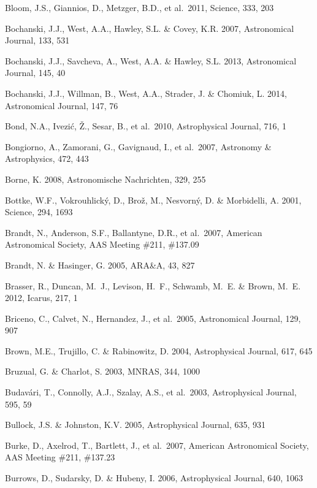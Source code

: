 \documentclass{emulateapj}
\begin{document}
\begin{thebibliography}{}
\bibitem[()]{} Bloom, J.S., Giannios, D., Metzger, B.D., et al.~2011, Science, 333, 203

\bibitem[()]{} Bochanski, J.J., West, A.A., Hawley, S.L. \& Covey, K.R. 2007, Astronomical Journal, 133, 531

\bibitem[()]{} Bochanski, J.J., Savcheva, A., West, A.A. \& Hawley, S.L. 2013, Astronomical Journal, 145, 40

\bibitem[()]{} Bochanski, J.J., Willman, B., West, A.A., Strader, J. \& Chomiuk, L. 2014, Astronomical Journal, 147, 76

\bibitem[()]{} Bond, N.A.,  Ivezi\'{c}, \v{Z}., Sesar, B., et al.~2010, Astrophysical Journal, 716, 1

\bibitem[()]{} Bongiorno, A., Zamorani, G., Gavignaud, I., et al.~2007, Astronomy \& Astrophysics, 472, 443 

\bibitem[()]{} Borne, K. 2008, Astronomische Nachrichten, 329, 255


\bibitem[()]{} Bottke, W.F., Vokrouhlick\'{y}, D., Bro\v{z}, M., Nesvorn\'y, D. \& Morbidelli, A. 2001, 
             Science, 294, 1693

\bibitem[()]{} Brandt, N., Anderson, S.F., Ballantyne, D.R., et al.~2007, American Astronomical 
             Society, AAS Meeting \#211, \#137.09

\bibitem[()]{} Brandt, N. \& Hasinger, G. 2005, ARA\&A, 43, 827

\bibitem[()]{} Brasser, R., Duncan, M.~J., Levison, H.~F., Schwamb, M.~E. \& Brown, M.~E. 2012, Icarus, 217, 1

\bibitem[()]{} Briceno, C., Calvet, N., Hernandez, J., et al.~2005, Astronomical Journal, 129, 907

\bibitem[()]{} Brown, M.E., Trujillo, C. \& Rabinowitz, D. 2004, Astrophysical Journal, 617, 645

\bibitem[()]{} Bruzual, G. \& Charlot, S. 2003, MNRAS, 344, 1000

\bibitem[()]{} Budav\'{a}ri, T., Connolly, A.J., Szalay, A.S., et al.~2003, Astrophysical Journal, 595, 59

\bibitem[()]{} Bullock, J.S. \& Johnston, K.V. 2005,  Astrophysical Journal, 635, 931

\bibitem[()]{} Burke, D., Axelrod, T., Bartlett, J., et al.~2007, 
                      American Astronomical Society, AAS Meeting \#211, \#137.23

\bibitem[()]{} Burrows, D., Sudarsky, D. \& Hubeny, I. 2006, Astrophysical Journal, 640, 1063


\end{thebibliography}
\end{document}
